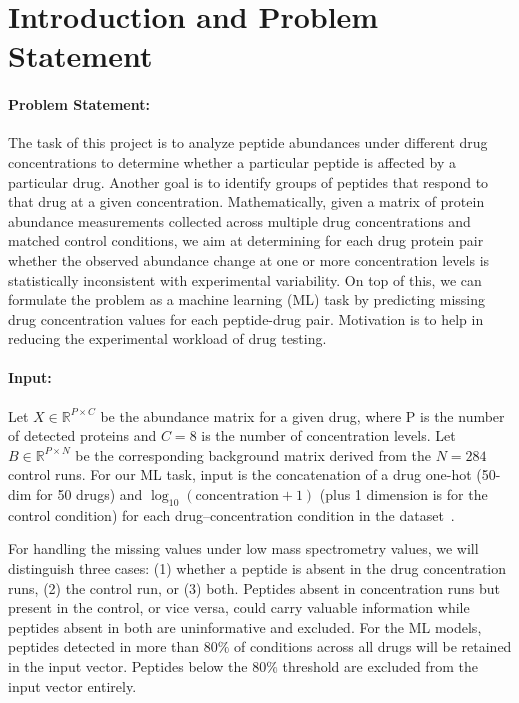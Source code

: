 \section{Introduction and Problem Statement}

\paragraph{Problem Statement:} The task of this project is to analyze peptide abundances under different drug concentrations to determine whether a particular peptide is affected by a particular drug. Another goal is to identify groups of peptides that respond to that drug at a given concentration. Mathematically, given a matrix of protein abundance measurements collected across multiple drug concentrations and matched control conditions, we aim at determining for each drug protein pair whether the observed abundance change at one or more concentration levels is statistically inconsistent with experimental variability. On top of this, we can formulate the problem as a machine learning (ML) task by predicting missing drug concentration values for each peptide-drug pair. Motivation is to help in reducing the experimental workload of drug testing.

\paragraph{Input:}   Let $X \in \mathbb{R}^{P\times C}$ be the abundance matrix for a given drug, where P is the number of detected proteins and $C=8$ is the number of concentration levels. Let $B \in \mathbb{R}^{P\times N}$ be the corresponding background matrix derived from the $N=284$ control runs. For our ML task, input is the concatenation of a drug one-hot (50-dim for 50 drugs) and $\log_{10}(\text{concentration} + 1)$ (plus 1 dimension is for the control condition) for each drug–concentration condition in the dataset~\cite{massive081932}.

For handling the missing values under low mass spectrometry values, we will distinguish three cases: (1) whether a peptide is absent in the drug concentration runs, (2) the control run, or (3) both. Peptides absent in concentration runs but present in the control, or vice versa, could carry valuable information while peptides absent in both are uninformative and excluded. For the ML models, peptides detected in more than $80\%$ of conditions across all drugs will be retained in the input vector. Peptides below the $80\%$ threshold are excluded from the input vector entirely.


